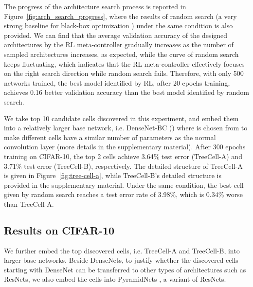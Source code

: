 \documentclass{article}
\begin{document}
The progress of the architecture search process is reported in Figure~\ref{fig:arch_search_progress}, where the results of random search (a very strong baseline for black-box optimization \cite{bergstra2012random}) under the same condition is also provided. We can find that the average validation accuracy of the designed architectures by the RL meta-controller gradually increases as the number of sampled architectures increases, as expected, while the curve of random search keeps fluctuating, which indicates that the RL meta-controller effectively focuses on the right search direction while random search fails. Therefore, with only 500 networks trained, the best model identified by RL, after 20 epochs training, achieves 0.16 better validation accuracy than the best model identified by random search. 

We take top 10 candidate cells discovered in this experiment, and embed them into a relatively larger base network, i.e. DenseNet-BC () where  is chosen from  to make different cells have a similar number of parameters as the normal  convolution layer (more details in the supplementary material). After 300 epochs training on CIFAR-10, the top 2 cells achieve 3.64\% test error (TreeCell-A) and 3.71\% test error (TreeCell-B), respectively. The detailed structure of TreeCell-A is given in Figure~\ref{fig:tree-cell-a}, while TreeCell-B's detailed structure is provided in the supplementary material. Under the same condition, the best cell given by random search reaches a test error rate of 3.98\%, which is 0.34\% worse than TreeCell-A.



\subsection{Results on CIFAR-10}
We further embed the top discovered cells, i.e. TreeCell-A and TreeCell-B, into larger base networks. Beside DenseNets, to justify whether the discovered cells starting with DenseNet can be transferred to other types of architectures such as ResNets, we also embed the cells into PyramidNets \cite{han2016deep}, a variant of ResNets. 
\end{document}

